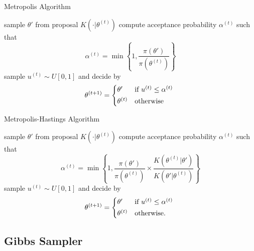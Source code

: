 \documentclass[fontsize=12pt]{article}
\begin{document}
\begin{algorithm}
	\caption{Metropolis Algorithm}\label{alg:metropolis}
	\begin{algorithmic}[1]
		\State sample $\theta'$ from proposal $K(\cdot\vert\theta^{(t)})$
		\State compute acceptance probability $\alpha^{(t)}$ such that
		\begin{equation*}
		\alpha^{(t)} = \min \left\lbrace
		1, \frac{\pi(\theta')}{\pi(\theta^{(t)})}
		\right\rbrace
		\end{equation*}
		\State sample $u^{(t)} \sim U[0,1]$ and decide by
		\begin{equation*}
		    \theta^{(t+1)} =
			\begin{cases*}
			\theta' & if $u^{(t)} \leq \alpha^{(t)}$ \\
			\theta^{(t)} & otherwise
			\end{cases*}
		\end{equation*}
		\EndFor
	\end{algorithmic}
\end{algorithm}
\begin{algorithm}
	\caption{Metropolis-Hastings Algorithm}\label{alg:metropolis-hastings}
	\begin{algorithmic}[1]
		\State sample $\theta'$ from proposal $K(\cdot\vert\theta^{(t)})$
		\State compute acceptance probability $\alpha^{(t)}$ such that
		\begin{equation*}
		\alpha^{(t)} = \min \left\lbrace
		1, \frac{\pi(\theta')}{\pi(\theta^{(t)})}
		\times 
		\frac{K(\theta^{(t)}\vert \theta')}{K(\theta' \vert \theta^{(t)})}
		\right\rbrace
		\end{equation*}
		\State sample $u^{(t)} \sim U[0,1]$ and decide by
		\begin{equation*}
		\theta^{(t+1)} =
		\begin{cases*}
		\theta' & if $u^{(t)} \leq \alpha^{(t)}$ \\
		\theta^{(t)} & otherwise.
		\end{cases*}
		\end{equation*}
		\EndFor
	\end{algorithmic}
\end{algorithm}

\subsection{Gibbs Sampler}
\end{document}
